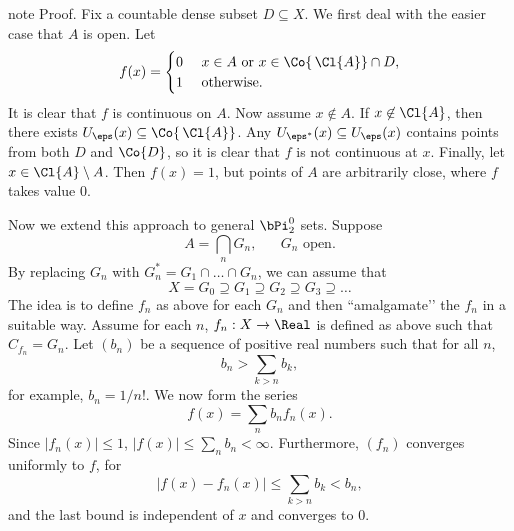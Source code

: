 \documentclass[letterpaper,10pt,english]{jupyterBook}
\begin{document}
\begin{sphinxadmonition}{note}
\sphinxAtStartPar
Proof. Fix a countable dense subset \(D  \subseteq X\).
We first deal with the easier case that \(A\) is open. Let
\begin{equation*}
	f(x) = \begin{cases}
		0 & \text{ $x \in A$ or $x \in \Co{\,\Cl{A}} \cap D$}, \\
		1 & \text{ otherwise}.
	\end{cases}
\end{equation*}
\sphinxAtStartPar
It is clear that \(f\) is continuous on \(A\). Now assume \(x \not \in A\). If \(x \not\in \Cl{A}\), then there exists  \(U_\eps(x) \subseteq \Co{\,\Cl{A}}\). Any \(U_{\eps^*}(x) \subseteq U_\eps(x)\) contains points from both \(D\) and \(\Co{D}\), so it is clear that \(f\) is not continuous at \(x\). Finally, let \(x \in \Cl{A} \setminus A\). Then \(f(x) = 1\), but points of \(A\) are arbitrarily close, where \(f\) takes value \(0\).

\sphinxAtStartPar
Now we extend this approach to general \(\bPi^0_2\) sets. Suppose
\begin{equation*}
	A = \bigcap_n G_n, \quad \text{ $G_n$ open}.
\end{equation*}
\sphinxAtStartPar
By replacing \(G_n\) with \(G_n^* = G_1 \cap \dots \cap G_n\), we can assume that
\begin{equation*}
	X = G_0 \supseteq G_1 \supseteq G_2 \supseteq G_3 \supseteq \dots
\end{equation*}
\sphinxAtStartPar
The idea is to define \(f_n\) as above for each \(G_n\) and then ``amalgamate’’ the \(f_n\) in a suitable way.
Assume for each \(n\), \(f_n: X \to \Real\) is defined as above such that \(C_{f_n} = G_n\).
Let \((b_n)\) be a sequence of positive real numbers such that for all \(n\),
\begin{equation*}
	b_n > \sum_{k > n} b_k,
\end{equation*}
\sphinxAtStartPar
for example, \(b_n = 1/n!\). We now form the series
\begin{equation*}
	f(x) = \sum_n b_n f_n(x).
\end{equation*}
\sphinxAtStartPar
Since \(|f_n(x)| \leq 1\), \(|f(x)| \leq \sum_n b_n < \infty\). Furthermore, \((f_n)\) converges uniformly to \(f\), for
\begin{equation*}
	|f(x) - f_n(x)| \leq \sum_{k > n} b_k < b_n,
\end{equation*}
\sphinxAtStartPar
and the last bound is independent of \(x\) and converges to \(0\).


\end{sphinxadmonition}
\end{document}
